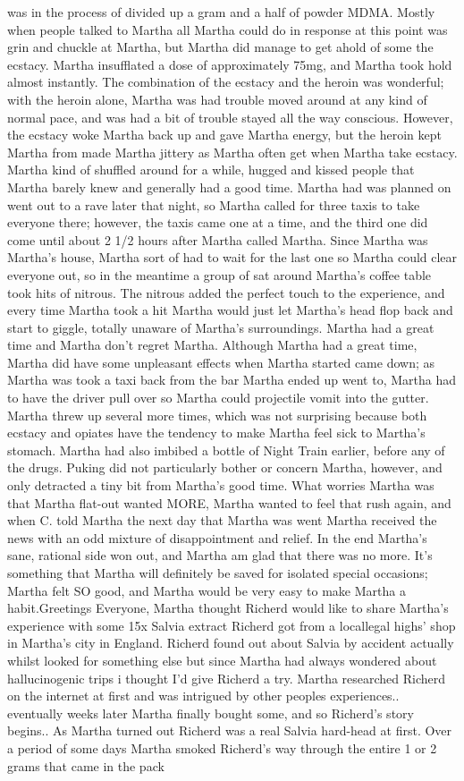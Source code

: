 \documentclass[12pt]{book}
\begin{document}
was in the process of divided up a gram and a half of powder MDMA. Mostly when people talked to Martha all Martha could do in response at this point was grin and chuckle at Martha, but Martha did manage to get ahold of some the ecstacy. Martha insufflated a dose of approximately 75mg, and Martha took hold almost instantly. The combination of the ecstacy and the heroin was wonderful; with the heroin alone, Martha was had trouble moved around at any kind of normal pace, and was had a bit of trouble stayed all the way conscious. However, the ecstacy woke Martha back up and gave Martha energy, but the heroin kept Martha from made Martha jittery as Martha often get when Martha take ecstacy. Martha kind of shuffled around for a while, hugged and kissed people that Martha barely knew and generally had a good time. Martha had was planned on went out to a rave later that night, so Martha called for three taxis to take everyone there; however, the taxis came one at a time, and the third one did come until about 2 1/2 hours after Martha called Martha. Since Martha was Martha's house, Martha sort of had to wait for the last one so Martha could clear everyone out, so in the meantime a group of sat around Martha's coffee table took hits of nitrous. The nitrous added the perfect touch to the experience, and every time Martha took a hit Martha would just let Martha's head flop back and start to giggle, totally unaware of Martha's surroundings. Martha had a great time and Martha don't regret Martha. Although Martha had a great time, Martha did have some unpleasant effects when Martha started came down; as Martha was took a taxi back from the bar Martha ended up went to, Martha had to have the driver pull over so Martha could projectile vomit into the gutter. Martha threw up several more times, which was not surprising because both ecstacy and opiates have the tendency to make Martha feel sick to Martha's stomach. Martha had also imbibed a bottle of Night Train earlier, before any of the drugs. Puking did not particularly bother or concern Martha, however, and only detracted a tiny bit from Martha's good time. What worries Martha was that Martha flat-out wanted MORE, Martha wanted to feel that rush again, and when C. told Martha the next day that Martha was went Martha received the news with an odd mixture of disappointment and relief. In the end Martha's sane, rational side won out, and Martha am glad that there was no more. It's something that Martha will definitely be saved for isolated special occasions; Martha felt SO good, and Martha would be very easy to make Martha a habit.Greetings Everyone, Martha thought Richerd would like to share Martha's experience with some 15x Salvia extract Richerd got from a locallegal highs' shop in Martha's city in England. Richerd found out about Salvia by accident actually whilst looked for something else but since Martha had always wondered about hallucinogenic trips i thought I'd give Richerd a try. Martha researched Richerd on the internet at first and was intrigued by other peoples experiences.. eventually weeks later Martha finally bought some, and so Richerd's story begins.. As Martha turned out Richerd was a real Salvia hard-head at first. Over a period of some days Martha smoked Richerd's way through the entire 1 or 2 grams that came in the pack 
\end{document}
